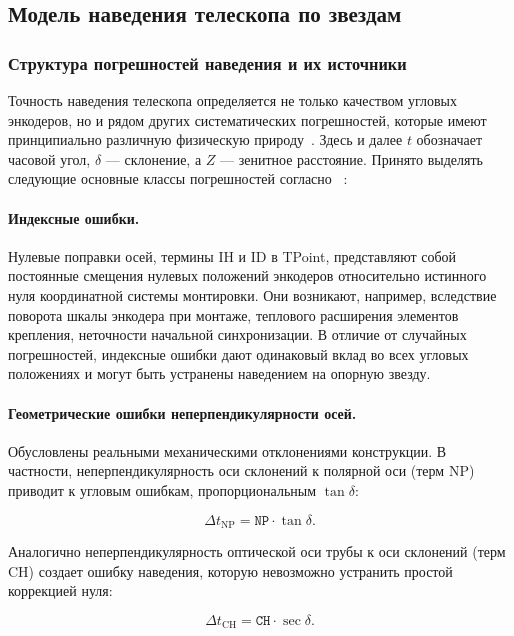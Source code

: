 \subsection{Модель наведения телескопа по звездам}
\label{subsec:pointing}

\subsubsection{Структура погрешностей наведения и их источники}
\label{subsubsec:pointing_errors}

Точность наведения телескопа определяется не только качеством угловых энкодеров, но и рядом других систематических погрешностей, которые имеют принципиально различную физическую природу~\cite{TPoint_Wallace}\cite{EngineersView}. Здесь и далее $t$ обозначает часовой угол, $\delta$ --- склонение, а $Z$ --- зенитное расстояние. Принято выделять следующие основные классы погрешностей согласно ~\cite{TPoint_Wallace}:

\paragraph{Индексные ошибки.} Нулевые поправки осей, термины IH и ID в TPoint, представляют собой постоянные смещения нулевых положений энкодеров относительно истинного нуля координатной системы монтировки. Они возникают, например, вследствие поворота шкалы энкодера при монтаже, теплового расширения элементов крепления, неточности начальной синхронизации. В отличие от случайных погрешностей, индексные ошибки дают одинаковый вклад во всех угловых положениях и могут быть устранены наведением на опорную звезду.

\paragraph{Геометрические ошибки неперпендикулярности осей.} Обусловлены реальными механическими отклонениями конструкции. В частности, неперпендикулярность оси склонений к полярной оси (терм NP) приводит к угловым ошибкам, пропорциональным $\tan\delta$:

$$
\Delta t_{\mathrm{NP}} = \mathtt{NP} \cdot \tan\delta.
$$

Аналогично неперпендикулярность оптической оси трубы к оси склонений (терм CH) создает ошибку наведения, которую невозможно устранить простой коррекцией нуля:

$$
\Delta t_{\mathrm{CH}} = \mathtt{CH} \cdot \sec\delta.
$$

